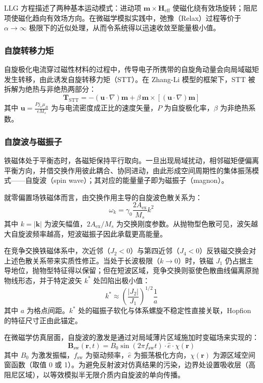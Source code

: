 \documentclass{article}
\begin{document}
LLG 方程描述了两种基本运动模式：进动项 $\mathbf{m} \times \mathbf{H}_{\text{eff}}$ 使磁化绕有效场旋转；阻尼项使磁化趋向有效场方向。在微磁学模拟实践中，弛豫（Relax）过程等价于 $\alpha \to \infty$ 极限下的近似处理，从而令系统得以迅速收敛至能量极小值。

\subsubsection*{自旋转移力矩}
自旋极化电流穿过磁性材料的过程中，传导电子所携带的自旋角动量会向局域磁矩发生转移，由此诱发自旋转移力矩（STT）。在 Zhang-Li 模型的框架下，STT 被拆解为绝热与非绝热两部分：
\begin{equation}
  \mathbf{T}_{\text{STT}} = -(\mathbf{u} \cdot \nabla)\mathbf{m} + \beta \, \mathbf{m} \times [(\mathbf{u} \cdot \nabla)\mathbf{m}]
  \label{eq:stt}
\end{equation}
其中 $\mathbf{u} = \frac{P j_e \mu_B}{e M_s}$ 为与电流密度成正比的速度矢量，$P$ 为自旋极化率，$\beta$ 为非绝热系数。


\subsubsection*{自旋波与磁振子}
铁磁体处于平衡态时，各磁矩保持平行取向。一旦出现局域扰动，相邻磁矩便偏离平衡方向，并借交换作用彼此耦合、协同进动，由此形成空间周期性的集体振荡模式——自旋波（spin wave）；其对应的能量量子即为磁振子（magnon）。

就零偏置场铁磁体而言，由交换作用主导的自旋波色散关系为：
\begin{equation}
  \omega_k = \gamma_0 \frac{2A_{\text{ex}}}{M_s} k^2
  \label{eq:sw-dispersion}
\end{equation}
其中 $k = |\mathbf{k}|$ 为波矢幅值，$2A_{\text{ex}}/M_s$ 为交换刚度参数。从抛物型色散可见，波矢越大自旋波频率越高，短波磁振子因此承载更高能量。

在竞争交换铁磁体系中，次近邻（$J_2 < 0$）与第四近邻（$J_4 < 0$）反铁磁交换会对上述色散关系带来实质性修正。当处于长波极限（$k \to 0$）时，铁磁 $J_1$ 仍占据主导地位，抛物型特征得以保留；但在短波区域，竞争交换则驱使色散曲线偏离原抛物线形态，并于特定波矢 $k^*$ 处凹陷出极小值：
\begin{equation}
  k^* \approx \left(\frac{|J_2|}{J_1}\right)^{1/2} \frac{1}{a}
  \label{eq:sw-kstar}
\end{equation}
其中 $a$ 为格点间距。$k^*$ 处的磁振子软化与体系螺旋不稳定性直接关联，Hopfion 的特征尺寸正由此锚定。

在微磁学仿真层面，自旋波的激发是通过对局域薄片区域施加时变磁场来实现的：
\begin{equation}
  \mathbf{B}_{\text{sw}}(\mathbf{r}, t) = B_0 \sin(2\pi f_{\text{sw}} t) \cdot \hat{e} \cdot \chi(\mathbf{r})
  \label{eq:sw-excitation}
\end{equation}
其中 $B_0$ 为激发振幅，$f_{\text{sw}}$ 为驱动频率，$\hat{e}$ 为振荡极化方向，$\chi(\mathbf{r})$ 为源区域空间窗函数（取值 0 或 1）。为避免反射波对仿真结果的污染，边界处设置吸收层（高阻尼区域），以等效模拟半无限介质内自旋波的单向传播。
\end{document}

